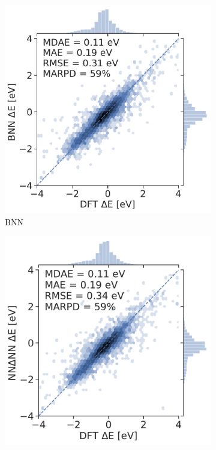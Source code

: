 \documentclass[]{achemso}
\begin{document}
\begin{figure}
\begin{subfigure}{0.32\textwidth}
        \includegraphics[width=\textwidth]{../BNN/parity.pdf}
        \caption{\gls{BNN}}\label{fig:parity_bnn}
    \end{subfigure}
    \begin{subfigure}{0.32\textwidth}
        \includegraphics[width=\textwidth]{../NNdNN/parity.pdf}

\end{subfigure}
\end{figure}
\end{document}
